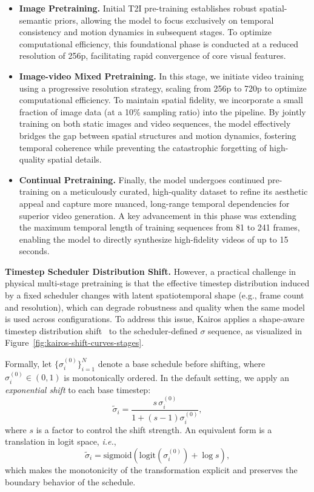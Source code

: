 \documentclass{llmxive}
\begin{document}
\begin{itemize}
\item \textbf {Image Pretraining.} 
Initial T2I pre-training establishes robust spatial-semantic priors, allowing the model to focus exclusively on temporal consistency and motion dynamics in subsequent stages. 
To optimize computational efficiency, this foundational phase is conducted at a reduced resolution of 256p, facilitating rapid convergence of core visual features. 


\item \textbf{Image-video Mixed Pretraining.}
In this stage, we initiate video training using a progressive resolution strategy, scaling from 256p to 720p to optimize computational efficiency. To maintain spatial fidelity, we incorporate a small fraction of image data (at a 10\% sampling ratio) into the pipeline. By jointly training on both static images and video sequences, the model effectively bridges the gap between spatial structures and motion dynamics, fostering temporal coherence while preventing the catastrophic forgetting of high-quality spatial details.

\item \textbf {Continual Pretraining.} Finally, the model undergoes continued pre-training on a meticulously curated, high-quality dataset to refine its aesthetic appeal and capture more nuanced, long-range temporal dependencies for superior video generation. A key advancement in this phase was extending the maximum temporal length of training sequences from 81 to 241 frames, enabling the model to directly synthesize high-fidelity videos of up to 15 seconds.
\end{itemize}

\textbf{Timestep Scheduler Distribution Shift.}
However, a practical challenge in physical multi-stage pretraining is that the effective timestep distribution induced by a fixed scheduler changes with latent spatiotemporal shape (e.g., frame count and resolution), which can degrade robustness and quality when the same model is used across configurations.
To address this issue, Kairos applies a shape-aware timestep distribution shift~\cite{sd3,hunyuanvideo,opensora2,wan2025} to the scheduler-defined $\sigma$ sequence, as visualized in Figure~\ref{fig:kairos-shift-curves-stages}.

Formally, let $\{\sigma_i^{(0)}\}_{i=1}^{N}$ denote a base schedule before shifting, where $\sigma_i^{(0)} \in (0,1)$ is monotonically ordered.
In the default setting, we apply an \emph{exponential shift} to each base timestep:
\begin{equation}
\tilde{\sigma}_i
=
\frac{s\,\sigma_i^{(0)}}{1 + (s-1)\sigma_i^{(0)}},
\label{eq:kairos_exp_shift_rational}
\end{equation}
where $s$ is a factor to control the shift strength.
An equivalent form is a translation in logit space, \textit{i.e.},
\begin{equation}
\tilde{\sigma}_i
=
\mathrm{sigmoid}\!\left(\mathrm{logit}\!\left(\sigma_i^{(0)}\right)+\log s\right),
\label{eq:kairos_exp_shift_logit}
\end{equation}
which makes the monotonicity of the transformation explicit and preserves the boundary behavior of the schedule.
\end{document}
